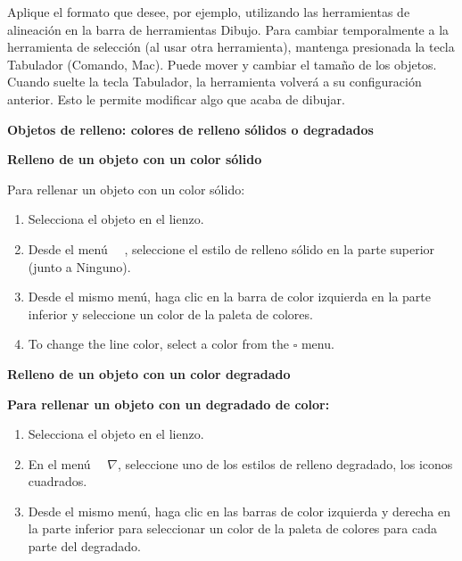 Aplique el formato que desee, por ejemplo, utilizando las herramientas de alineación en la barra de herramientas Dibujo. Para cambiar temporalmente a la herramienta de selección (al usar otra herramienta), mantenga presionada la tecla Tabulador (Comando, Mac). Puede mover y cambiar el tamaño de los objetos. Cuando suelte la tecla Tabulador, la herramienta volverá a su configuración anterior. Esto le permite modificar algo que acaba de dibujar.

\textbf{Objetos de relleno: colores de relleno sólidos o degradados}

\textbf{Relleno de un objeto con un color sólido}

Para rellenar un objeto con un color sólido:

\begin{enumerate}
	\item Selecciona el objeto en el lienzo.
	
	\item Desde el menú $\quad$, seleccione el estilo de relleno sólido en la parte superior (junto a Ninguno).
	
	\item Desde el mismo menú, haga clic en la barra de color izquierda en la parte inferior y seleccione un color de la paleta de colores.
	
\end{enumerate}




\begin{enumerate}
  \setcounter{enumi}{3}
  \item To change the line color, select a color from the $\square$ menu.
\end{enumerate}




\textbf{Relleno de un objeto con un color degradado}

\textbf{Para rellenar un objeto con un degradado de color:}
\begin{enumerate}
	\item Selecciona el objeto en el lienzo.
	
	\item En el menú $\quad \nabla$, seleccione uno de los estilos de relleno degradado, los iconos cuadrados.
	
	\item Desde el mismo menú, haga clic en las barras de color izquierda y derecha en la parte inferior para seleccionar un color de la paleta de colores para cada parte del degradado.
	
\end{enumerate}

